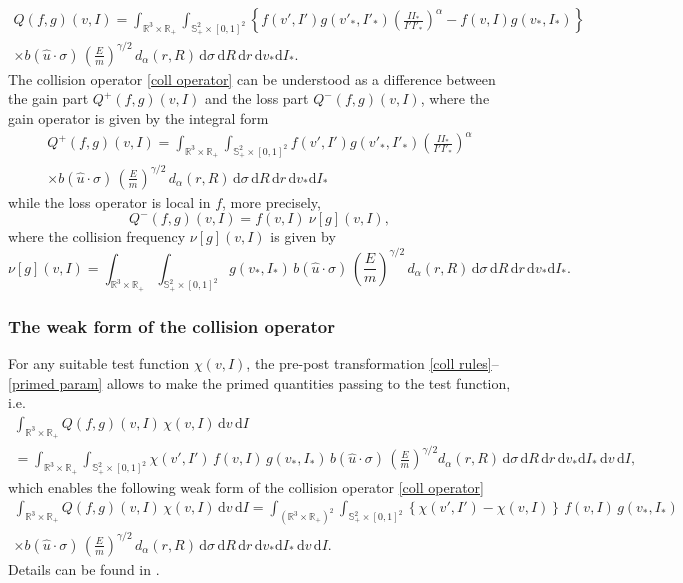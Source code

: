 \documentclass[11pt,a4paper]{amsart}
\newcommand{\bRp}{\mathbb{R}_+}
\newcommand{\bRfp}{\mathbb{R}^3 \times \bRp}
\newcommand{\bSp}{\mathbb{S}^2_+}
\newcommand{\md}{\mathrm{d}}
\newcommand{\dpo}{d_\alpha(r,R)}
\newcommand{\g}{\gamma}
\newcommand{\E}{\left(\frac{E}{m}\right)}
\newcommand{\domparam}{\bSp \times [0,1]^2}
\newcommand{\iallintro}{\int_{(\bRfp)^2}\int_{\domparam}}
\newcommand{\istarintro}{\int_{\bRfp}\int_{\domparam }}
\newcommand{\dall}{ \md \sigma \, \md R \, \md r \, \md v_* \md I_* \, \md v \, \md I}
\newcommand{\dstar}{ \md \sigma \, \md R \, \md r \, \md v_* \md I_*}
\begin{document}
 \begin{multline}\label{coll operator}
 	Q(f,g)(v,I) =\istarintro \left\{ f(v',I')g(v'_*,I'_*) \left(\frac{I I_*}{I' I'_*}\right)^{\alpha}   - f(v,I)g(v_*, I_*) \right\} \\ \times b(\hat{u}\cdot\sigma) \, \E^{\g/2} \, \dpo  \, \dstar.
 \end{multline}
 The collision operator  \eqref{coll operator} can be understood as a difference between the gain part $	Q^+(f,g)(v,I)$ and the loss part $	Q^-(f,g)(v,I)$, where the gain operator is given by the integral form
 \begin{multline}\label{coll gain operator}
 	Q^+(f,g)(v,I) =\istarintro  f(v',I')g(v'_*,I'_*) \left(\frac{I I_*}{I' I'_* }\right)^{\alpha}    \\ \times b(\hat{u}\cdot\sigma) \, \E^{\g/2} \, \dpo  \, \dstar
 \end{multline}
 while the loss operator is local in $f$, more precisely,
 \begin{equation}\label{coll loss operator}
 	Q^-(f,g)(v,I) =  f(v,I) \	\nu[g](v,I),
 \end{equation}
 where the collision frequency $\nu[g](v,I)$ is given by
 \begin{equation}\label{coll fr}
 	\nu[g](v,I) = \istarintro g(v_*, I_*) \, b(\hat{u}\cdot\sigma) \, \E^{\g/2} \, \dpo  \, \dstar.
 \end{equation}
 
 \subsubsection*{The weak form of the collision operator}
 For any suitable test function $\chi(v,I)$, the pre-post transformation \eqref{coll rules}--\eqref{primed param} allows to make the primed quantities passing to the test function, i.e.
 \begin{multline}\label{weak form pre-post}
 	\int_{\bRfp} Q(f,g)(v, I) \, \chi(v,I) \, \md v\, \md I  
 	\\	=  \istarintro  \chi(v', I')   \, f(v, I) \, g(v_*, I_*) \,
 	b(\hat{u}\cdot\sigma) \, \E^{\g/2}  \dpo \, \dall,
 \end{multline}
 which enables the following weak form of the collision operator \eqref{coll operator} 
 \begin{multline}\label{weak form}
 	\int_{\bRfp} Q(f,g)(v, I) \, \chi(v,I) \, \md v\, \md I  
 	=  \iallintro \left\{  \chi(v', I')  - \chi(v, I) \right\} \, f(v, I) \, g(v_*, I_*) 
 	\\ \times b(\hat{u}\cdot\sigma) \, \E^{\g/2} \, \dpo \, \dall.
 \end{multline}
 Details can be found in \cite{DesMonSalv, MC-Alonso-Gamba}. 
 
\end{document}
